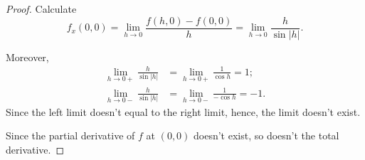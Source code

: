 \begin{Exercise}
\begin{proof}
Calculate
$$
f_x(0,0) 
= \lim_{h\to 0} \frac{f(h,0)-f(0,0)}{h}
= \lim_{h\to 0} \frac{h}{\sin|h|}.
$$

Moreover,
\begin{align*}
\lim_{h\to0+} \frac{h}{\sin|h|} &= \lim_{h\to0+} \frac{1}{\cos h} = 1; \\
\lim_{h\to0-} \frac{h}{\sin|h|} &= \lim_{h\to0-} \frac{1}{-\cos h} = -1.
\end{align*}
Since the left limit doesn't equal to the right limit, hence, the limit doesn't exist.

Since the partial derivative of $f$ at $(0,0)$ doesn't exist, so doesn't the total derivative.
\end{proof}
\end{Exercise}